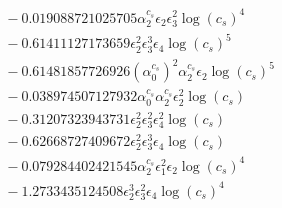 \documentclass[10pt]{article}
\begin{document}
\begin{align*}
&{}  - 0.019088721025705 \alpha_{2}^{c_s} \epsilon_{2} \epsilon_{3}^{2} \log{\left(c_{s} \right)}^{4} \\
&{}  - 0.61411127173659 \epsilon_{2}^{2} \epsilon_{3}^{3} \epsilon_{4} \log{\left(c_{s} \right)}^{5} \\
&{}  - 0.61481857726926 \left(\alpha_{0}^{c_s}\right)^{2} \alpha_{2}^{c_s} \epsilon_{2} \log{\left(c_{s} \right)}^{5} \\
&{}  - 0.038974507127932 \alpha_{0}^{c_s} \alpha_{2}^{c_s} \epsilon_{2}^{2} \log{\left(c_{s} \right)} \\
&{}  - 0.31207323943731 \epsilon_{2}^{2} \epsilon_{3}^{2} \epsilon_{4}^{2} \log{\left(c_{s} \right)} \\
&{}  - 0.62668727409672 \epsilon_{2}^{2} \epsilon_{3}^{3} \epsilon_{4} \log{\left(c_{s} \right)} \\
&{}  - 0.079284402421545 \alpha_{2}^{c_s} \epsilon_{1}^{2} \epsilon_{2} \log{\left(c_{s} \right)}^{4} \\
&{}  - 1.2733435124508 \epsilon_{2}^{3} \epsilon_{3}^{2} \epsilon_{4} \log{\left(c_{s} \right)}^{4}
\end{align*}
\end{document}
